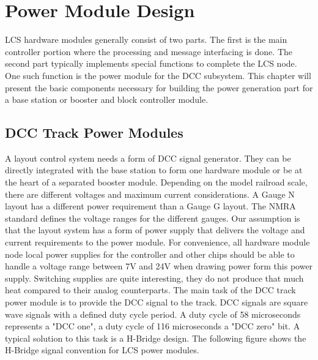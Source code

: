 \chapter{Power Module Design}

LCS hardware modules generally consist of two parts. The first is the main controller portion where the processing and message interfacing is done. The second part typically implements special functions to complete the LCS node. One such function is the power module for the DCC subsystem. This chapter will present the basic components necessary for building the power generation part for a base station or booster and block controller module.

\section{DCC Track Power Modules}

A layout control system needs a form of DCC signal generator. They can be directly integrated with the base station to form one hardware module or be at the heart of a separated booster module. Depending on the model railroad scale, there are different voltages and maximum current considerations. A Gauge N layout has a different power requirement than a Gauge G layout. The NMRA standard defines the voltage ranges for the different gauges. Our assumption is that the layout system has a form of power supply that delivers the voltage and current requirements to the power module. For convenience, all hardware module node local power supplies for the controller and other chips should be able to handle a voltage range between 7V and 24V when drawing power form this power supply. Switching supplies are quite interesting, they do not produce that much heat compared to their analog counterparts. The main task of the DCC track power module is to provide the DCC signal to the track. DCC signals are square wave signals with a defined duty cycle period. A duty cycle of 58 microseconds represents a "DCC one", a duty cycle of 116 microseconds a "DCC zero" bit. A typical solution to this task is a H-Bridge design. The following figure shows the H-Bridge signal convention for LCS power modules.


